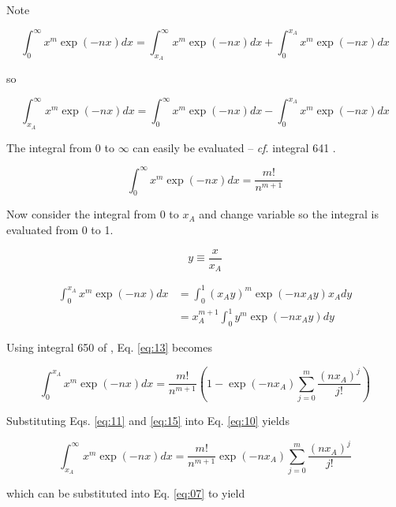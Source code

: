 \documentclass[letterpaper,12pt]{article}
\begin{document}
\noindent Note

\begin{equation} \label{eq:09}
\int_{0}^{\infty} x^{m} \exp(-nx) dx = \int_{x_{A}}^{\infty} x^{m} \exp(-nx) dx + \int_{0}^{x_{A}} x^{m} \exp(-nx) dx
\end{equation}

\noindent so

\begin{equation} \label{eq:10}
\int_{x_{A}}^{\infty} x^{m} \exp(-nx) dx = \int_{0}^{\infty} x^{m} \exp(-nx) dx - \int_{0}^{x_{A}} x^{m} \exp(-nx) dx
\end{equation}

\noindent The integral from 0 to $\infty$ can easily be evaluated -- \emph{cf}. integral 641 \cite{9780849324796}.

\begin{equation} \label{eq:11}
\int_{0}^{\infty} x^{m} \exp(-nx) dx = \frac{m!}{n^{m+1}}
\end{equation}

Now consider the integral from 0 to $x_{A}$ and change variable so the integral is evaluated from 0 to 1.

\begin{equation} \label{eq:12}
y \equiv \frac{x}{x_{A}}
\end{equation}

\begin{align} \label{eq:13}
\int_{0}^{x_{A}} x^{m} \exp(-nx) dx &= \int_{0}^{1} (x_{A}y)^{m} \exp(-nx_{A}y) x_{A} dy \nonumber \\
 &= x_{A}^{m+1} \int_{0}^{1} y^{m} \exp(-nx_{A}y) dy
\end{align}

\noindent Using integral 650 of \cite{9780849324796}, Eq. \ref{eq:13} becomes

\begin{equation} \label{eq:15}
\int_{0}^{x_{A}} x^{m} \exp(-nx) dx = \frac{m!}{n^{m+1}} \left(1 - \exp(-n x_{A}) \sum_{j = 0}^{m} \frac{(n x_{A})^{j}}{j!} \right) 
\end{equation}

Substituting Eqs. \ref{eq:11} and \ref{eq:15} into Eq. \ref{eq:10} yields

\begin{equation} \label{eq:31}
\int_{x_{A}}^{\infty} x^{m} \exp(-nx) dx = \frac{m!}{n^{m+1}} \exp(-n x_{A}) \sum_{j = 0}^{m} \frac{(n x_{A})^{j}}{j!}
\end{equation}

which can be substituted into Eq. \ref{eq:07} to yield
\end{document}
